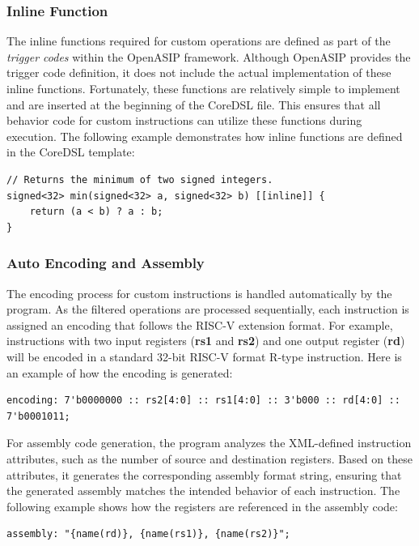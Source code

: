 \subsubsection{Inline Function}

The inline functions required for custom operations are defined as part of the \textit{trigger codes} within the OpenASIP framework. Although OpenASIP provides the trigger code definition, it does not include the actual implementation of these inline functions. Fortunately, these functions are relatively simple to implement and are inserted at the beginning of the CoreDSL file. This ensures that all behavior code for custom instructions can utilize these functions during execution. The following example demonstrates how inline functions are defined in the CoreDSL template:

\begin{lstlisting}
// Returns the minimum of two signed integers.
signed<32> min(signed<32> a, signed<32> b) [[inline]] {
    return (a < b) ? a : b;
}
\end{lstlisting}

\subsubsection{Auto Encoding and Assembly}

The encoding process for custom instructions is handled automatically by the program. As the filtered operations are processed sequentially, each instruction is assigned an encoding that follows the RISC-V extension format. For example, instructions with two input registers (\textbf{rs1} and \textbf{rs2}) and one output register (\textbf{rd}) will be encoded in a standard 32-bit RISC-V format R-type instruction. Here is an example of how the encoding is generated:

\begin{lstlisting}
encoding: 7'b0000000 :: rs2[4:0] :: rs1[4:0] :: 3'b000 :: rd[4:0] :: 7'b0001011;
\end{lstlisting}

For assembly code generation, the program analyzes the XML-defined instruction attributes, such as the number of source and destination registers. Based on these attributes, it generates the corresponding assembly format string, ensuring that the generated assembly matches the intended behavior of each instruction. The following example shows how the registers are referenced in the assembly code:

\begin{lstlisting}
assembly: "{name(rd)}, {name(rs1)}, {name(rs2)}";
\end{lstlisting}

